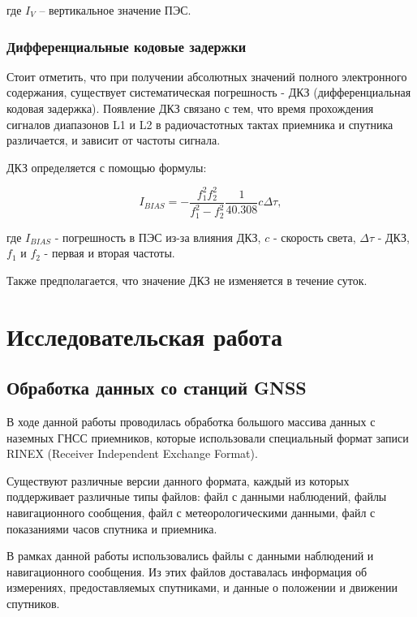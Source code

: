 \documentclass[a4paper]{article}
\begin{document}
где $I_V$ -- вертикальное значение ПЭС. 

\subsubsection{Дифференциальные кодовые задержки}
Стоит отметить, что при получении абсолютных значений полного электронного содержания, существует систематическая погрешность - ДКЗ (дифференциальная кодовая задержка). Появление ДКЗ связано с тем, что время прохождения сигналов диапазонов L1 и L2 в радиочастотных тактах приемника и спутника различается, и зависит от частоты сигнала.

ДКЗ определяется с помощью формулы:

\begin{equation}
I_{BIAS} = -\frac{f_1^2 f_2^2}{f_1^2 - f_2^2} \frac{1}{40.308} c\Delta \tau,
\end{equation}

где $I_{BIAS}$ - погрешность в ПЭС из-за влияния ДКЗ, $c$ - скорость света, $\Delta\tau$ - ДКЗ, $f_1$ и $f_2$ - первая и вторая частоты.

Также предполагается, что значение ДКЗ не изменяется в течение суток.


\newpage
\section{Исследовательская работа}
\subsection{Обработка данных со станций GNSS}
В ходе данной работы проводилась обработка большого массива данных с наземных ГНСС приемников, которые использовали специальный формат записи RINEX (Receiver Independent Exchange Format).
 
 Существуют различные версии данного формата, каждый из которых поддерживает различные типы файлов: файл с данными наблюдений, файлы навигационного сообщения, файл с метеорологическими данными, файл с показаниями часов спутника и приемника.
 
 В рамках данной работы использовались файлы с данными наблюдений и навигационного сообщения. Из этих файлов доставалась информация об измерениях, предоставляемых спутниками, и данные о положении и движении спутников.
  
\end{document}
